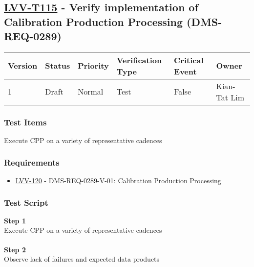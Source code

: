 \hypertarget{lvv-t115---verify-implementation-of-calibration-production-processing-dms-req-0289}{%
\subsection{\texorpdfstring{\href{https://jira.lsstcorp.org/secure/Tests.jspa\#/testCase/LVV-T115}{LVV-T115}
- Verify implementation of Calibration Production Processing
(DMS-REQ-0289)}{LVV-T115 - Verify implementation of Calibration Production Processing (DMS-REQ-0289)}}\label{lvv-t115---verify-implementation-of-calibration-production-processing-dms-req-0289}}

\begin{longtable}[]{@{}llllll@{}}
\toprule
Version & Status & Priority & Verification Type & Critical Event &
Owner\tabularnewline
\midrule
\endhead
1 & Draft & Normal & Test & False & Kian-Tat Lim\tabularnewline
\bottomrule
\end{longtable}

\hypertarget{test-items-91}{%
\subsubsection{Test Items}\label{test-items-91}}

Execute CPP on a variety of representative cadences

\hypertarget{requirements-92}{%
\subsubsection{Requirements}\label{requirements-92}}

\begin{itemize}
\tightlist
\item
  \href{https://jira.lsstcorp.org/browse/LVV-120}{LVV-120} -
  DMS-REQ-0289-V-01: Calibration Production Processing
\end{itemize}

\hypertarget{test-script-92}{%
\subsubsection{Test Script}\label{test-script-92}}

\textbf{Step 1}\\
Execute CPP on a variety of representative cadences\\
~\\
\textbf{Step 2}\\
Observe lack of failures and expected data products\\
~\\

